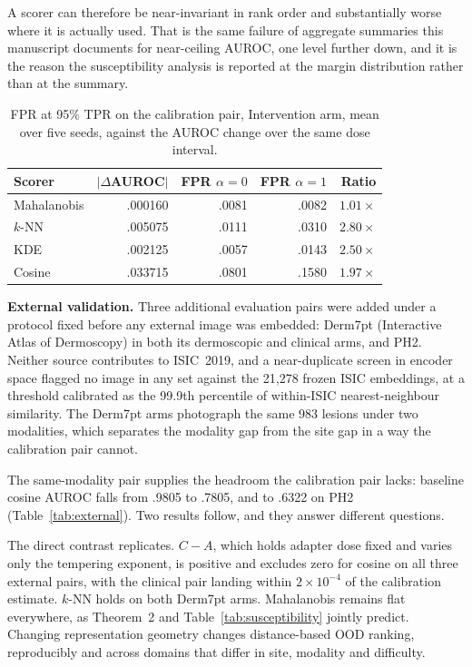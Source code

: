 \documentclass[11pt,a4paper]{article}
\begin{document}
A scorer can therefore be near-invariant in rank order and substantially worse
where it is actually used. That is the same failure of aggregate summaries this
manuscript documents for near-ceiling AUROC, one level further down, and it is
the reason the susceptibility analysis is reported at the margin distribution
rather than at the summary.

\begin{table}[t]
\centering
\caption{FPR at 95\% TPR on the calibration pair, Intervention arm, mean over five seeds, against the AUROC change over the same dose interval.}
\label{tab:fpr}
\small
\begin{tabular}{lrrrr}
\toprule
Scorer & $|\Delta$AUROC$|$ & FPR $\alpha{=}0$ & FPR $\alpha{=}1$ & Ratio\\
\midrule
Mahalanobis & .000160 & .0081 & .0082 & $1.01\times$\\
$k$-NN & .005075 & .0111 & .0310 & $2.80\times$\\
KDE & .002125 & .0057 & .0143 & $2.50\times$\\
Cosine & .033715 & .0801 & .1580 & $1.97\times$\\
\bottomrule
\end{tabular}
\end{table}

\label{sec:external}
\textbf{External validation.} Three additional evaluation pairs were added under a protocol fixed before any external image was embedded: Derm7pt (Interactive Atlas of Dermoscopy) in both its dermoscopic and clinical arms, and PH2. Neither source contributes to ISIC~2019, and a near-duplicate screen in encoder space flagged no image in any set against the 21{,}278 frozen ISIC embeddings, at a threshold calibrated as the 99.9th percentile of within-ISIC nearest-neighbour similarity. The Derm7pt arms photograph the same 983 lesions under two modalities, which separates the modality gap from the site gap in a way the calibration pair cannot.

The same-modality pair supplies the headroom the calibration pair lacks: baseline cosine AUROC falls from .9805 to .7805, and to .6322 on PH2 (Table~\ref{tab:external}). Two results follow, and they answer different questions.

The direct contrast replicates. $C-A$, which holds adapter dose fixed and varies only the tempering exponent, is positive and excludes zero for cosine on all three external pairs, with the clinical pair landing within $2\times10^{-4}$ of the calibration estimate. $k$-NN holds on both Derm7pt arms. Mahalanobis remains flat everywhere, as Theorem~2 and Table~\ref{tab:susceptibility} jointly predict. Changing representation geometry changes distance-based OOD ranking, reproducibly and across domains that differ in site, modality and difficulty.
\end{document}
